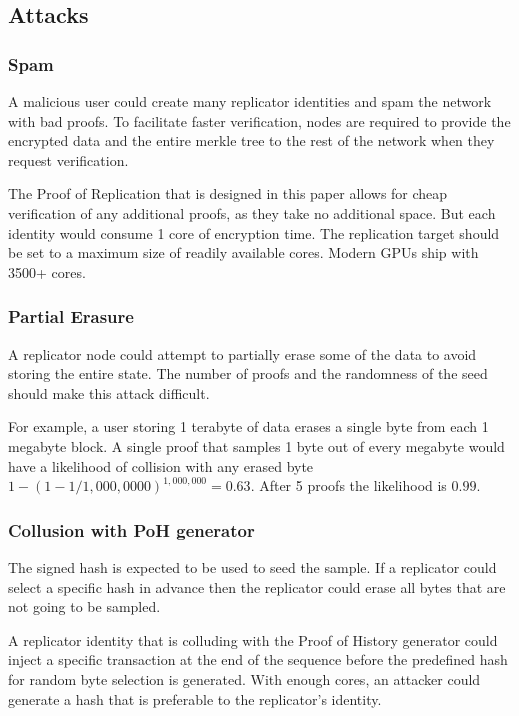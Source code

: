 \documentclass[12pt]{ltjsarticle}
\begin{document}
\subsection{Attacks}
\subsubsection{Spam}
A malicious user could create many replicator identities and spam the network with bad proofs. To facilitate faster verification, nodes are required to provide the encrypted data and the entire merkle tree to the rest of the network when they request verification.

The Proof of Replication that is designed in this paper allows for cheap verification of any additional proofs, as they take no additional space. But each identity would consume 1 core of encryption time. The replication target should be set to a maximum size of readily available cores. Modern GPUs ship with 3500+ cores.

\subsubsection{Partial Erasure}

A replicator node could attempt to partially erase some of the data to avoid storing the entire state. The number of proofs and the randomness of the seed should make this attack difficult.

For example, a user storing 1 terabyte of data erases a single byte from each 1 megabyte block. A single proof that samples 1 byte out of every megabyte would have a likelihood of collision with any erased byte \(1 - (1- 1/1,000,0000)^{1,000,000} = 0.63\). After 5 proofs the likelihood is \(0.99\).

\subsubsection{Collusion with PoH generator}

The signed hash is expected to be used to seed the sample. If a replicator could select a specific hash in advance then the replicator could erase all bytes that are not going to be sampled.

A replicator identity that is colluding with the Proof of History generator could inject a specific transaction at the end of the sequence before the predefined hash for random byte selection is generated. With enough cores, an attacker could generate a hash that is preferable to the replicator’s identity.
\end{document}

